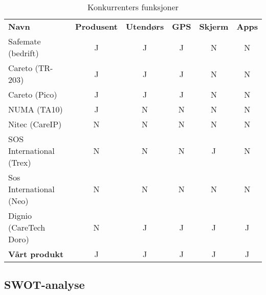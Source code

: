 \begin{table}
  \centering
  \begin{tabular}{lccccc}
    \textbf{Navn} &
    \textbf{Produsent} &
    \textbf{Utendørs} &
    \textbf{GPS} &
    \textbf{Skjerm} &
    \textbf{Apps} \\

    Safemate (bedrift) & J & J  & J  & N  & N \\
    Careto (TR-203)    & J & J  & J  & N  & N \\
    Careto (Pico)      & J & J  & J  & N  & N \\
    NUMA (TA10)        & J & N  & N  & N  & N \\
    Nitec (CareIP)     & N & N  & N  & N  & N \\
    SOS International
    (Trex)             & N & N  & N  & J  & N \\
    Sos International
    (Neo)              & N & N  & N  & N  & N \\
    Dignio
    (CareTech Doro)    & N & J  & J  & J  & J \\
    \textbf{Vårt produkt}
                       & J & J  & J  & J  & J \\
  \end{tabular}
  \caption{Konkurrenters funksjoner}
  \label{table.konkurranse.funksjoner}
\end{table}

\subsection{SWOT-analyse}


